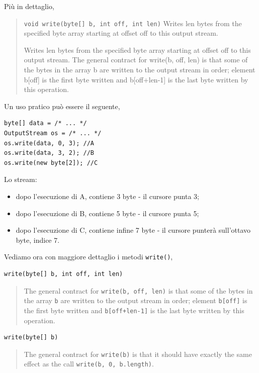\documentclass[\fontsizeclass,twocolumn]{\classname}
\theoremstyle{definition}
\theoremstyle{definition}
\begin{document}
Più in dettaglio,
\begin{quote}
    \footnotesize{\texttt{void 	write(byte[] b, int off, int len)} 	Writes len bytes from the specified byte array starting at offset off to this output stream.

Writes len bytes from the specified byte array starting at offset off to this output stream. The general contract for write(b, off, len) is that some of the bytes in the array b are written to the output stream in order; element b[off] is the first byte written and b[off+len-1] is the last byte written by this operation.}
\end{quote}

Un uso pratico può essere il seguente,

\begin{lstlisting}
byte[] data = /* ... */
OutputStream os = /* ... */
os.write(data, 0, 3); //A
os.write(data, 3, 2); //B
os.write(new byte[2]); //C
\end{lstlisting}

Lo stream:
\begin{itemize}
    \item dopo l'esecuzione di A, contiene 3 byte \-- il cursore punta 3;
    \item dopo l'esecuzione di B, contiene 5 byte \-- il cursore punta 5;
    \item dopo l'esecuzione di C, contiene infine 7 byte \-- il cursore punterà
        sull'ottavo byte, indice 7.
\end{itemize}

Vediamo ora con maggiore dettaglio i metodi \texttt{write()},

\begin{lstlisting}
write(byte[] b, int off, int len)
\end{lstlisting}

\begin{quote}
    \footnotesize{The general contract for \texttt{write(b, off, len)} is that some of
        the bytes in the array \texttt{b} are written to the output stream in order; element
        \texttt{b[off]} is the first byte written and \texttt{b[off+len-1]} is the last byte written by
this operation.}
\end{quote}

\begin{lstlisting}
write(byte[] b)
\end{lstlisting}

\begin{quote}
    \footnotesize{The general contract for \texttt{write(b)} is that it should have
        exactly the same effect as the call \texttt{write(b, 0, b.length)}.
}
\end{quote}
\end{document}
